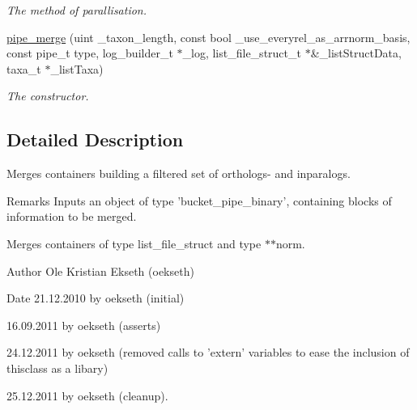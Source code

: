 \begin{DoxyCompactItemize}
\begin{DoxyCompactList}\small\item\em The method of parallisation. \end{DoxyCompactList}\item 
\hypertarget{classpipe__merge_a83a45c65f321c5bcad54ba7e4f5c83f7}{
\hyperlink{classpipe__merge_a83a45c65f321c5bcad54ba7e4f5c83f7}{pipe\_\-merge} (uint \_\-taxon\_\-length, const bool \_\-use\_\-everyrel\_\-as\_\-arrnorm\_\-basis, const pipe\_\-t type, log\_\-builder\_\-t $\ast$\_\-log, list\_\-file\_\-struct\_\-t $\ast$\&\_\-listStructData, taxa\_\-t $\ast$\_\-listTaxa)}
\label{classpipe__merge_a83a45c65f321c5bcad54ba7e4f5c83f7}

\begin{DoxyCompactList}\small\item\em The constructor. \end{DoxyCompactList}\end{DoxyCompactItemize}


\subsection{Detailed Description}
Merges containers building a filtered set of orthologs-\/ and inparalogs. 

\begin{DoxyRemark}{Remarks}
Inputs an object of type 'bucket\_\-pipe\_\-binary', containing blocks of information to be merged.
\begin{DoxyItemize}
\item Merges containers of type list\_\-file\_\-struct and type $\ast$$\ast$norm. 
\end{DoxyItemize}
\end{DoxyRemark}
\begin{DoxyAuthor}{Author}
Ole Kristian Ekseth (oekseth) 
\end{DoxyAuthor}
\begin{DoxyDate}{Date}
21.12.2010 by oekseth (initial) 

16.09.2011 by oekseth (asserts) 

24.12.2011 by oekseth (removed calls to 'extern' variables to ease the inclusion of thisclass as a libary) 

25.12.2011 by oekseth (cleanup). 
\end{DoxyDate}


